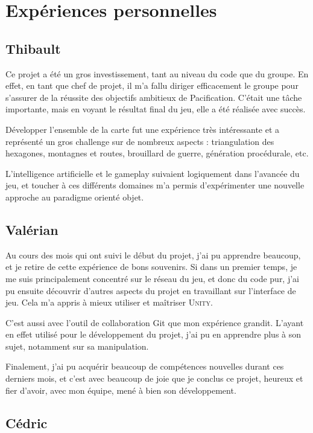\documentclass[12pt]{report}
\begin{document}
\chapter{Expériences personnelles}

\section{Thibault}

Ce projet a été un gros investissement, tant au niveau du code que du groupe.
En effet, en tant que chef de projet, il m’a fallu diriger efficacement le
groupe pour s’assurer de la réussite des objectifs ambitieux de Pacification.
C'était une tâche importante, mais en voyant le résultat final du jeu, elle a
été réalisée avec succès.

Développer l'ensemble de la carte fut une expérience très intéressante et a
représenté un gros challenge sur de nombreux aspects : triangulation des
hexagones, montagnes et routes, brouillard de guerre, génération procédurale,
etc.

L'intelligence artificielle et le gameplay suivaient logiquement dans l'avancée
du jeu, et toucher à ces différents domaines m'a permis d'expérimenter une
nouvelle approche au paradigme orienté objet.

\section{Valérian}

Au cours des mois qui ont suivi le début du projet, j’ai pu apprendre beaucoup,
et je retire de cette expérience de bons souvenirs. Si dans un premier temps, je
me suis principalement concentré sur le réseau du jeu, et donc du code pur, j’ai
pu ensuite découvrir d’autres aspects du projet en travaillant sur l’interface
de jeu. Cela m’a appris à mieux utiliser et maîtriser \textsc{Unity}.

\newpage

C’est aussi avec l’outil de collaboration Git que mon expérience grandit.
L’ayant en effet utilisé pour le développement du projet, j’ai pu en apprendre
plus à son sujet, notamment sur sa manipulation. 

Finalement, j’ai pu acquérir beaucoup de compétences nouvelles durant ces
derniers mois, et c’est avec beaucoup de joie que je conclus ce projet, heureux
et fier d’avoir, avec mon équipe, mené à bien son développement.

\section{Cédric}
\end{document}

